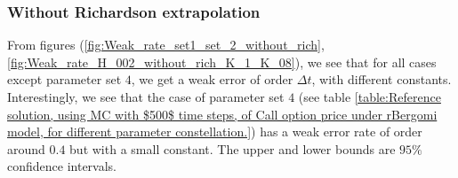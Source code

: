 \FloatBarrier


\subsubsection{Without Richardson extrapolation}
From figures (\ref{fig:Weak_rate_set1_set_2_without_rich},\ref{fig:Weak_rate_H_002_without_rich_K_1_K_08}), we see that for all cases  except parameter set $4$, we get a weak error of order $\Delta t$, with different  constants. Interestingly, we see that the case of parameter set $4$ (see table \ref{table:Reference solution, using MC with $500$ time steps, of Call option price under rBergomi model, for different parameter constellation.}) has a weak error rate of order around $0.4$ but with a small constant. The upper and lower bounds are $95\%$ confidence intervals.

